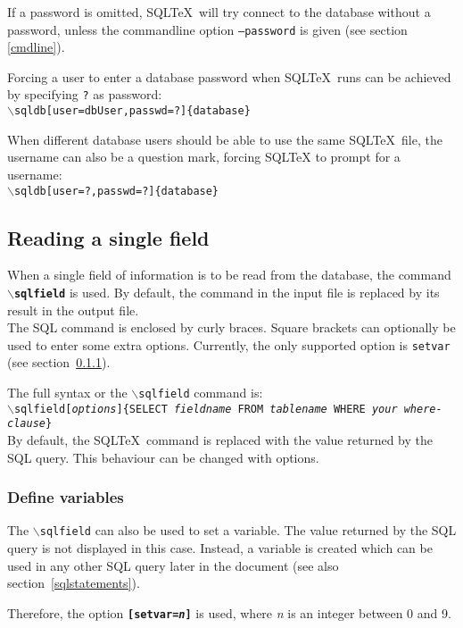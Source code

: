 \documentclass{article}
\newcommand{\bs}{\ensuremath{\backslash}}
\newcommand{\vs}{\vspace{3mm}}
\begin{document}
If a password is omitted, SQL\TeX\ will try connect to the database without a password, unless the commandline option \texttt{--password} is given (see section \ref{cmdline}).

\vs 

Forcing a user to enter a database password when SQL\TeX\ runs can be achieved by specifying \texttt{?} as password:\\
\texttt{\bs sqldb[user=dbUser,passwd=?]\{database\}}

\vs

When different database users should be able to use the same SQL\TeX\ file, the username can also be a question mark, forcing SQL\TeX
to prompt for a username:\\
\texttt{\bs sqldb[user=?,passwd=?]\{database\}}

\subsection{Reading a single field}\label{sqlfield}

When a single field of information is to be read from the database, the command \texttt{\textbf{\bs sqlfield}}
is used. By default, the command in the input file is replaced by its result in the output file.\\
The SQL command is enclosed by curly braces. Square brackets can optionally be used to enter some extra options.
Currently, the only supported option is \texttt{setvar} (see section~\ref{vars}).

The full syntax or the \texttt{\bs sqlfield} command is:\\
\texttt{\bs sqlfield[\textit{options}]\{SELECT \textit{fieldname} FROM \textit{tablename} WHERE \textit{your where-clause}\}} \\
By default, the SQL\TeX\ command is replaced with the value returned by the SQL query. This behaviour
can be changed with options.


\subsubsection{Define variables}\label{vars}

The \texttt{\bs sqlfield} can also be used to set a variable. The value returned by the SQL query is not
displayed in this case. Instead, a variable is created which can be used in any other SQL query later in
the document (see also section~\ref{sqlstatements}).

Therefore, the option \texttt{\textbf{[setvar=\textit{n}]}} is used, where \textit{n} is an integer between
0 and 9.
\end{document}
